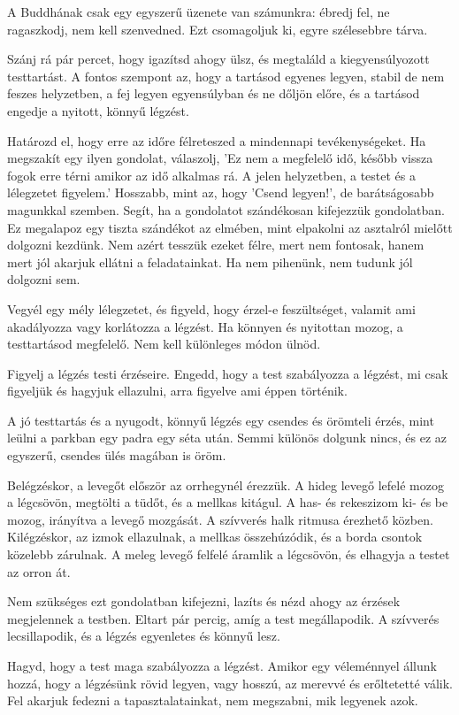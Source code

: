 A Buddhának csak egy egyszerű üzenete van számunkra: ébredj fel, ne
ragaszkodj, nem kell szenvedned. Ezt csomagoljuk ki, egyre szélesebbre
tárva.

Szánj rá pár percet, hogy igazítsd ahogy ülsz, és megtaláld a
kiegyensúlyozott testtartást. A fontos szempont az, hogy a tartásod
egyenes legyen, stabil de nem feszes helyzetben, a fej legyen
egyensúlyban és ne dőljön előre, és a tartásod engedje a nyitott, könnyű
légzést.

Határozd el, hogy erre az időre félreteszed a mindennapi
tevékenységeket. Ha megszakít egy ilyen gondolat, válaszolj, 'Ez nem a
megfelelő idő, később vissza fogok erre térni amikor az idő alkalmas rá.
A jelen helyzetben, a testet és a lélegzetet figyelem.' Hosszabb, mint
az, hogy 'Csend legyen!', de barátságosabb magunkkal szemben. Segít, ha
a gondolatot szándékosan kifejezzük gondolatban. Ez megalapoz egy tiszta
szándékot az elmében, mint elpakolni az asztalról mielőtt dolgozni
kezdünk. Nem azért tesszük ezeket félre, mert nem fontosak, hanem mert
jól akarjuk ellátni a feladatainkat. Ha nem pihenünk, nem tudunk jól
dolgozni sem.

Vegyél egy mély lélegzetet, és figyeld, hogy érzel-e feszültséget,
valamit ami akadályozza vagy korlátozza a légzést. Ha könnyen és
nyitottan mozog, a testtartásod megfelelő. Nem kell különleges módon
ülnöd.

Figyelj a légzés testi érzéseire. Engedd, hogy a test szabályozza a
légzést, mi csak figyeljük és hagyjuk ellazulni, arra figyelve ami éppen
történik.

A jó testtartás és a nyugodt, könnyű légzés egy csendes és örömteli
érzés, mint leülni a parkban egy padra egy séta után. Semmi különös
dolgunk nincs, és ez az egyszerű, csendes ülés magában is öröm.

Belégzéskor, a levegőt először az orrhegynél érezzük. A hideg levegő
lefelé mozog a légcsövön, megtölti a tüdőt, és a mellkas kitágul. A has-
és rekeszizom ki- és be mozog, irányítva a levegő mozgását. A szívverés
halk ritmusa érezhető közben. Kilégzéskor, az izmok ellazulnak, a
mellkas összehúzódik, és a borda csontok közelebb zárulnak. A meleg
levegő felfelé áramlik a légcsövön, és elhagyja a testet az orron át.

Nem szükséges ezt gondolatban kifejezni, lazíts és nézd ahogy az érzések
megjelennek a testben. Eltart pár percig, amíg a test megállapodik. A
szívverés lecsillapodik, és a légzés egyenletes és könnyű lesz.

Hagyd, hogy a test maga szabályozza a légzést. Amikor egy véleménnyel
állunk hozzá, hogy a légzésünk rövid legyen, vagy hosszú, az merevvé és
erőltetetté válik. Fel akarjuk fedezni a tapasztalatainkat, nem
megszabni, mik legyenek azok.

